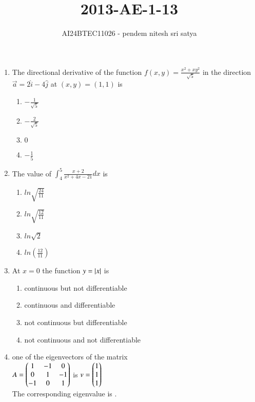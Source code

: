 \documentclass[journal,12pt,onecolumn]{IEEEtran}
\theoremstyle{remark}
\begin{document}

\vspace{3cm}

\title{\textbf{2013-AE-1-13}}
\author{AI24BTEC11026 - pendem nitesh sri satya}
\maketitle
\bigskip

\renewcommand{\thefigure}{\theenumi}
\renewcommand{\thetable}{\theenumi}
\setlength{\columnsep}{2.5em}
\begin{enumerate}
[start=1]
\item The directional derivative of the function $f(x,y)=\frac{x^2+xy^2}{\sqrt{5}}$ in the direction $\overrightarrow{a}=2 \hat{i}-4 \hat{j}$ at $(x,y)=(1,1)$ is 
\begin{enumerate}
    \item $-\frac{1}{\sqrt{5}}$
    \item $-\frac{2}{\sqrt{5}}$
    \item $0$
    \item $-\frac{1}{5} $\\
\end{enumerate}

\item The value of $\int_4^5 \frac{x+2}{x^2+4x-21} dx$ is 
\begin{enumerate}
    \item $ln\sqrt{\frac{24}{11}}$
    \item $ln\sqrt{\frac{12}{11}}$
    \item $ln\sqrt{2}$
    \item $ln(\frac{12}{11})$\\
\end{enumerate}

\item At $x=0$ the function $y=\left\vert x\right\vert$ is
\begin{enumerate}
    \item continuous but not differentiable
    \item continuous and differentiable
    \item not continuous but differentiable
    \item not continuous and not differentiable \\
\end{enumerate}

\item one of the eigenvectors of the matrix \\ $A=\begin{pmatrix}1 & -1 & 0\\ 0 & 1 & -1\\-1 & 0 & 1 \end{pmatrix}$ is $v=  \begin{pmatrix}1 \\ 1 \\ 1\end{pmatrix}$ \\ The corresponding eigenvalue is \underline{\hspace{1cm}}.\\


\end{enumerate}
\end{document}
